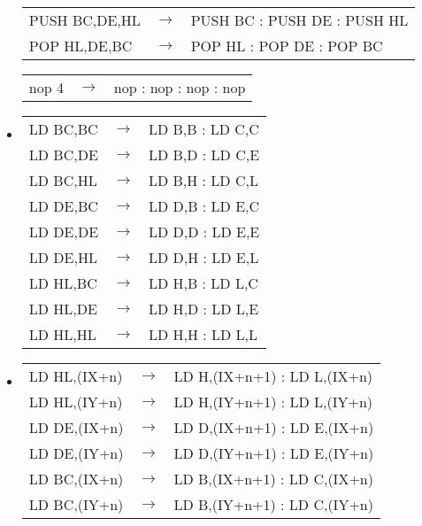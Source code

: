 \begin{itemize}


\begin{tabular}{lll}
PUSH BC,DE,HL & $\rightarrow$ & PUSH BC : PUSH DE : PUSH HL \\
POP HL,DE,BC & $\rightarrow$ & POP HL : POP DE : POP BC
\end{tabular}


\begin{tabular}{lll}
nop 4 & $\rightarrow$ & nop : nop : nop : nop \\
\end{tabular}

\item {}

\begin{tabular}{lll}
LD BC,BC & $\rightarrow$ & LD B,B : LD C,C \\
LD BC,DE & $\rightarrow$ & LD B,D : LD C,E \\
LD BC,HL & $\rightarrow$ & LD B,H : LD C,L \\
LD DE,BC & $\rightarrow$ & LD D,B : LD E,C \\
LD DE,DE & $\rightarrow$ & LD D,D : LD E,E \\
LD DE,HL & $\rightarrow$ & LD D,H : LD E,L \\
LD HL,BC & $\rightarrow$ & LD H,B : LD L,C \\
LD HL,DE & $\rightarrow$ & LD H,D : LD L,E \\
LD HL,HL & $\rightarrow$ & LD H,H : LD L,L \\
\end{tabular}

\item {}

\begin{tabular}{lll}
LD HL,(IX+n) & $\rightarrow$ & LD H,(IX+n+1) : LD L,(IX+n) \\
LD HL,(IY+n) & $\rightarrow$ & LD H,(IY+n+1) : LD L,(IY+n) \\
LD DE,(IX+n) & $\rightarrow$ & LD D,(IX+n+1) : LD E,(IX+n) \\
LD DE,(IY+n) & $\rightarrow$ & LD D,(IY+n+1) : LD E,(IY+n) \\
LD BC,(IX+n) & $\rightarrow$ & LD B,(IX+n+1) : LD C,(IX+n) \\
LD BC,(IY+n) & $\rightarrow$ & LD B,(IY+n+1) : LD C,(IY+n) \\
\end{tabular}


\end{itemize}

